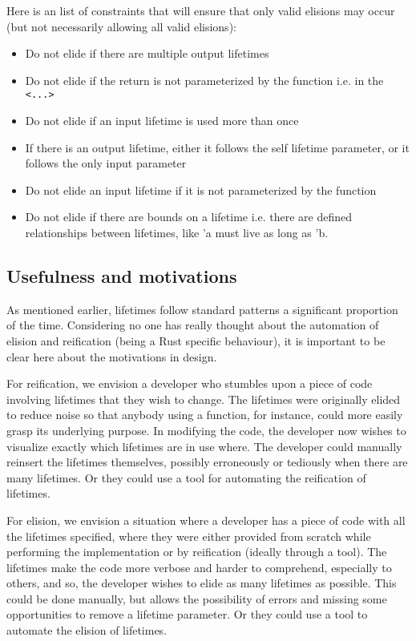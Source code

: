 Here is an list of constraints that will ensure that only valid elisions may occur (but not necessarily allowing all valid elisions):
\begin{itemize}
\item Do not elide if there are multiple output lifetimes
\item Do not elide if the return is not parameterized by the function i.e. in the {\verb|<...>|}
\item Do not elide if an input lifetime is used more than once
\item If there is an output lifetime, either it follows the self lifetime parameter, or it follows the only input parameter
\item Do not elide an input lifetime if it is not parameterized by the function
\item Do not elide if there are bounds on a lifetime i.e. there are defined relationships between lifetimes, like 'a must live as long as 'b.
\end{itemize}

\subsection{Usefulness and motivations}
As mentioned earlier, lifetimes follow standard patterns a significant proportion of the time. Considering no one has really thought about the automation of elision and reification (being a Rust specific behaviour), it is important to be clear here about the motivations in design. 

For reification, we envision a developer who stumbles upon a piece of code involving lifetimes that they wish to change. The lifetimes were originally elided to reduce noise so that anybody using a function, for instance, could more easily grasp its underlying purpose. In modifying the code, the developer now wishes to visualize exactly which lifetimes are in use where. The developer could manually reinsert the lifetimes themselves, possibly erroneously or tediously when there are many lifetimes. Or they could use a tool for automating the reification of lifetimes.

For elision, we envision a situation where a developer has a piece of code with all the lifetimes specified, where they were either provided from scratch while performing the implementation or by reification (ideally through a tool). The lifetimes make the code more verbose and harder to comprehend, especially to others, and so, the developer wishes to elide as many lifetimes as possible. This could be done manually, but allows the possibility of errors and missing some opportunities to remove a lifetime parameter. Or they could use a tool to automate the elision of lifetimes. 

